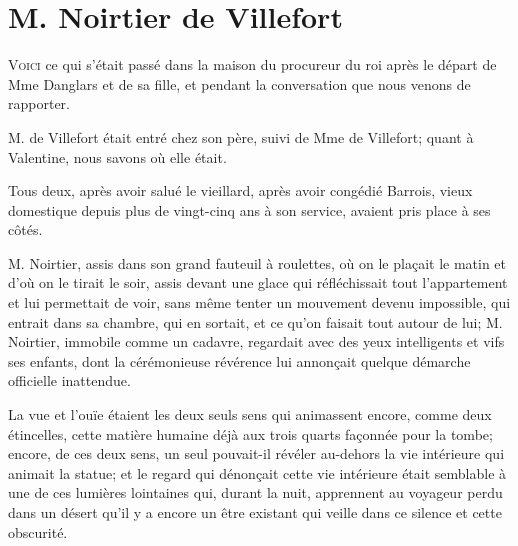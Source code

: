 \chapter{M. Noirtier de Villefort}

\lettrine{V}{oici} ce qui s'était passé dans la maison du procureur du roi après le départ de Mme Danglars et de sa fille, et pendant la conversation que nous venons de rapporter. 

\zz
M. de Villefort était entré chez son père, suivi de Mme de Villefort; quant à Valentine, nous savons où elle était. 

Tous deux, après avoir salué le vieillard, après avoir congédié Barrois, vieux domestique depuis plus de vingt-cinq ans à son service, avaient pris place à ses côtés. 

M. Noirtier, assis dans son grand fauteuil à roulettes, où on le plaçait le matin et d'où on le tirait le soir, assis devant une glace qui réfléchissait tout l'appartement et lui permettait de voir, sans même tenter un mouvement devenu impossible, qui entrait dans sa chambre, qui en sortait, et ce qu'on faisait tout autour de lui; M. Noirtier, immobile comme un cadavre, regardait avec des yeux intelligents et vifs ses enfants, dont la cérémonieuse révérence lui annonçait quelque démarche officielle inattendue. 

La vue et l'ouïe étaient les deux seuls sens qui animassent encore, comme deux étincelles, cette matière humaine déjà aux trois quarts façonnée pour la tombe; encore, de ces deux sens, un seul pouvait-il révéler au-dehors la vie intérieure qui animait la statue; et le regard qui dénonçait cette vie intérieure était semblable à une de ces lumières lointaines qui, durant la nuit, apprennent au voyageur perdu dans un désert qu'il y a encore un être existant qui veille dans ce silence et cette obscurité. 

